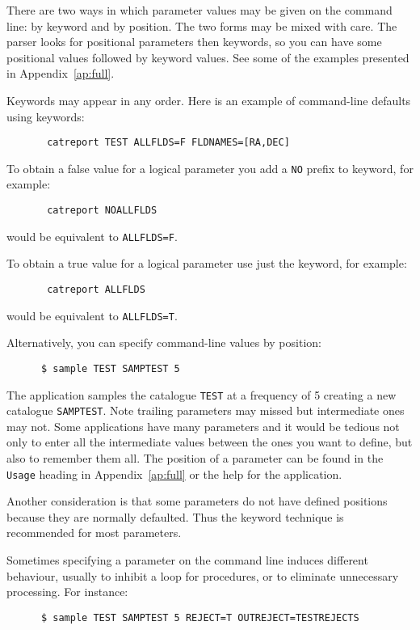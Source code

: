 There are two ways in which parameter values may be given on the
command line: by keyword and by position. The two forms may be
mixed with care. The parser looks for positional parameters then
keywords, so you can have some positional values followed by keyword
values.  See some of the examples presented in Appendix~\ref{ap:full}.

Keywords may appear in any order.
Here is an example of command-line defaults using keywords:
\begin{verbatim}
       catreport TEST ALLFLDS=F FLDNAMES=[RA,DEC]
\end{verbatim}

To obtain a false value for a logical parameter
you add a {\tt NO} prefix to keyword, for example:
\begin{verbatim}
       catreport NOALLFLDS
\end{verbatim}
would be equivalent to {\tt ALLFLDS=F}.

To obtain a true value for a logical parameter use just the keyword,
for example:
\begin{verbatim}
       catreport ALLFLDS
\end{verbatim}
would be equivalent to {\tt ALLFLDS=T}.

Alternatively, you can specify command-line values by position:
\begin{verbatim}
      $ sample TEST SAMPTEST 5
\end{verbatim}
The application samples the catalogue {\tt TEST} at a frequency of 5 creating
a new catalogue {\tt SAMPTEST}. Note
trailing parameters may missed but
intermediate ones may not.  Some applications have many parameters and
it would be tedious not only to enter all the intermediate values
between the ones you want to define, but also to remember them all. The
position of a parameter can be found in the {\tt Usage} heading
in Appendix~\ref{ap:full} or the help for the application.

Another consideration is that some parameters do not have defined positions
because they are normally defaulted. Thus the keyword technique is
recommended for most parameters.

Sometimes specifying a parameter on the command line induces different
behaviour, usually to inhibit a loop for procedures, or to eliminate
unnecessary processing.
For instance:

\begin{verbatim}
      $ sample TEST SAMPTEST 5 REJECT=T OUTREJECT=TESTREJECTS
\end{verbatim}

